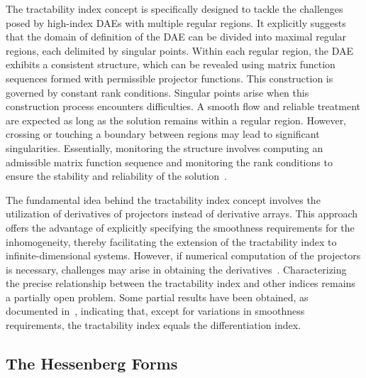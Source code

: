 The tractability index concept is specifically designed to tackle the challenges posed by high-index \acp{DAE} with multiple regular regions. It explicitly suggests that the domain of definition of the \ac{DAE} can be divided into maximal regular regions, each delimited by singular points. Within each regular region, the \ac{DAE} exhibits a consistent structure, which can be revealed using matrix function sequences formed with permissible projector functions. This construction is governed by constant rank conditions. Singular points arise when this construction process encounters difficulties. A smooth flow and reliable treatment are expected as long as the solution remains within a regular region. However, crossing or touching a boundary between regions may lead to significant singularities. Essentially, monitoring the structure involves computing an admissible matrix function sequence and monitoring the rank conditions to ensure the stability and reliability of the solution~\cite{lamour2011computational}.

The fundamental idea behind the tractability index concept involves the utilization of derivatives of projectors instead of derivative arrays. This approach offers the advantage of explicitly specifying the smoothness requirements for the inhomogeneity, thereby facilitating the extension of the tractability index to infinite-dimensional systems. However, if numerical computation of the projectors is necessary, challenges may arise in obtaining the derivatives~\cite{mehrmann2015index}. Characterizing the precise relationship between the tractability index and other indices remains a partially open problem. Some partial results have been obtained, as documented in~\cite{campbell1995index, campbell1995solvability, marz2005characterizing}, indicating that, except for variations in smoothness requirements, the tractability index equals the differentiation index.

\subsection{The Hessenberg Forms}


